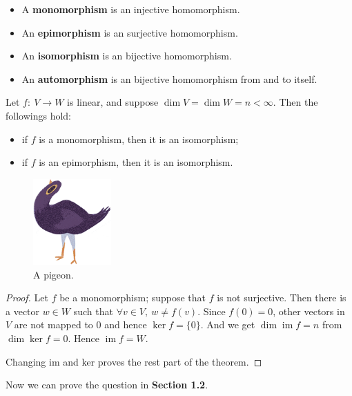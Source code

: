 \begin{defn}
\leavevmode
\begin{itemize}
\item A \textbf{monomorphism} is an injective homomorphism.
\item An \textbf{epimorphism} is an surjective homomorphism.
\item An \textbf{isomorphism} is an bijective homomorphism.
\item An \textbf{automorphism} is an bijective homomorphism from and to itself.
\end{itemize}
\end{defn}

\begin{theorem} Let $f:~V \to W$ is linear, and suppose $\operatorname{dim}V = \operatorname{dim}W = n < \infty.$ Then the followings hold:
\begin{itemize}
\item if $f$ is a monomorphism, then it is an isomorphism;
\item if $f$ is an epimorphism, then it is an isomorphism.
\end{itemize}
\end{theorem}

\begin{figure}
\centering
\includegraphics[width=3cm]{dove}
\caption{A pigeon.}
\end{figure}


\begin{proof}
Let $f$ be a monomorphism; suppose that $f$ is not surjective. Then there is a vector $w \in W$ such that $\forall v\in V,~w\ne f(v).$ Since $f(0)=0$, other vectors in $V$ are not mapped to 0 and hence $\ker f = \{0\}.$ And we get $\operatorname{dim}\operatorname{im}f = n$ from $\operatorname{dim}\ker  f = 0$. Hence $\operatorname{im}f = W.$

Changing im and ker proves the rest part of the theorem.
\end{proof}

Now we can prove the question in \textbf{Section 1.2}.

